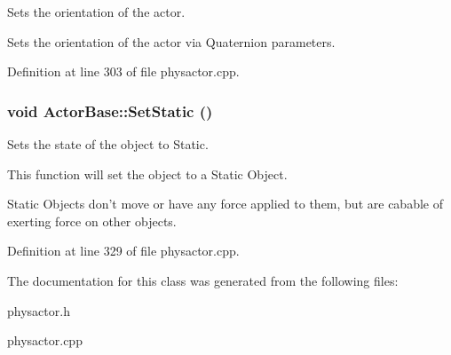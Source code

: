 Sets the orientation of the actor. 

Sets the orientation of the actor via Quaternion parameters. 

Definition at line 303 of file physactor.cpp.

\hypertarget{classActorBase_a97f55e5fff5d69483ebb0b9042a50bb0}{
\subsubsection[{SetStatic}]{\setlength{\rightskip}{0pt plus 5cm}void ActorBase::SetStatic ()}}
\label{dd/d7b/classActorBase_a97f55e5fff5d69483ebb0b9042a50bb0}


Sets the state of the object to Static. 

This function will set the object to a Static Object. \par
 Static Objects don't move or have any force applied to them, but are cabable of exerting force on other objects. 

Definition at line 329 of file physactor.cpp.



The documentation for this class was generated from the following files:\begin{DoxyCompactItemize}
\item 
physactor.h\item 
physactor.cpp\end{DoxyCompactItemize}
